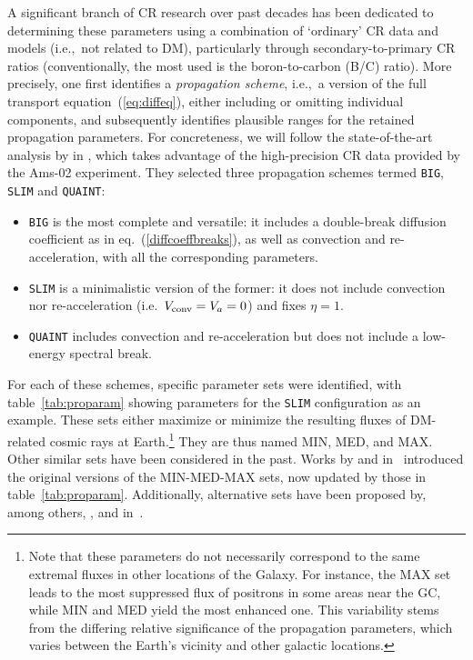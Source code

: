 A significant branch of CR research over past decades has been dedicated to determining these parameters using a combination of `ordinary'  CR data and models (i.e.,~not related to DM), particularly through secondary-to-primary CR ratios (conventionally, the most used  is the boron-to-carbon (B/C) ratio). 
More precisely, one first identifies a {\em propagation scheme}, i.e.,~a version of the full transport equation~(\ref{eq:diffeq}), 
either including or omitting individual components, and subsequently identifies plausible ranges for the retained propagation parameters.
For concreteness, we will follow the state-of-the-art analysis by  in \cite{CRpropagation}, which takes advantage of the high-precision CR data provided by the {\sc Ams}-02 experiment. 
They selected three propagation schemes termed \texttt{BIG}, \texttt{SLIM} and \texttt{QUAINT}:
\begin{itemize}
    \item[$\blacktriangleright$]
\texttt{BIG} is the most complete and versatile: it includes a double-break diffusion coefficient as in eq.~(\ref{diffcoeffbreaks}), as well as convection and re-acceleration, with all the corresponding parameters.
    \item[$\blacktriangleright$] 
 \texttt{SLIM}    is a minimalistic version of the former: it does not include convection nor re-acceleration (i.e.~$V_{\rm conv} = V_a = 0$) and fixes $\eta =1$.
 \item[$\blacktriangleright$]
 \texttt{QUAINT} includes convection and re-acceleration but does not include a low-energy spectral break. 
 \end{itemize}
For each of these schemes, specific parameter sets were identified, with table~\ref{tab:proparam} showing parameters for the \texttt{SLIM} configuration as an example. 
These sets either maximize or minimize the resulting fluxes of DM-related cosmic rays at Earth.\footnote{Note that these parameters do not necessarily correspond to the same extremal fluxes in other locations of the Galaxy. 
For instance, the MAX set leads to the most suppressed flux of positrons in some areas near the GC, 
while MIN and MED yield the most enhanced one. 
This variability stems from the differing relative significance of the propagation parameters, which varies between the Earth's vicinity and other galactic locations.
} 
They are thus named MIN, MED, and MAX.
Other similar sets have been considered in the past. 
Works by  
and  in~\cite{CRpropagation}  introduced the original versions of the MIN-MED-MAX sets, now updated by those in table~\ref{tab:proparam}. 
Additionally, alternative sets have been proposed by, among others,  
,  and 
 in~\cite{CRpropagation}.



